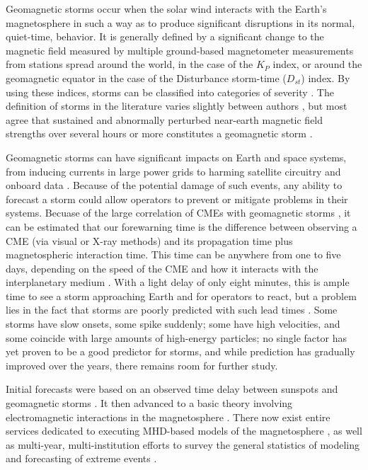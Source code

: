 \documentclass[10pt]{article}
\begin{document}
Geomagnetic storms occur when the solar wind interacts with the Earth's magnetosphere in such a way as to produce significant disruptions in its normal, quiet-time, behavior. It is generally defined by a significant change to the magnetic field measured by multiple ground-based magnetometer measurements from stations spread around the world, in the case of the $K_P$ index, or around the geomagnetic equator in the case of the Disturbance storm-time ($D_{st}$) index. By using these indices, storms can be classified into categories of severity \citep{NOAAScale}. The definition of storms in the literature varies slightly between authors \citep{Yermolaev}, but most agree that sustained and abnormally perturbed near-earth magnetic field strengths over several hours or more constitutes a geomagnetic storm \citep{StormDefinition}. 

Geomagnetic storms can have significant impacts on Earth and space systems, from inducing currents in large power grids to harming satellite circuitry and onboard data \citep{1989Storm}. Because of the potential damage of such events, any ability to forecast a storm could allow operators to prevent or mitigate problems in their systems. Becuase of the large correlation of CMEs with geomagnetic storms \citep{Yermolaev}, it can be estimated that our forewarning time is the difference between observing a CME (via visual or X-ray methods) and its propagation time plus magnetospheric interaction time. This time can be anywhere from one to five days, depending on the speed of the CME and how it interacts with the interplanetary medium \citep{StormSources}. With a light delay of only eight minutes, this is ample time to see a storm approaching Earth and for operators to react, but a problem lies in the fact that storms are poorly predicted with such lead times \citep{WeigelDecision}. Some storms have slow onsets, some spike suddenly; some have high velocities, and some coincide with large amounts of high-energy particles; no single factor has yet proven to be a good predictor for storms, and while prediction has gradually improved over the years, there remains room for further study. 

Initial forecasts were based on an observed time delay between sunspots and geomagnetic storms \citep{SunspotStorms}. It then advanced to a basic theory involving electromagnetic interactions in the magnetosphere \citep{Chapman}. There now exist entire services dedicated to executing MHD-based models of the magnetosphere \citep{CCMC}, as well as multi-year, multi-institution efforts to survey the general statistics of modeling and forecasting of extreme events \citep{ExtremeEvents}.
\end{document}
